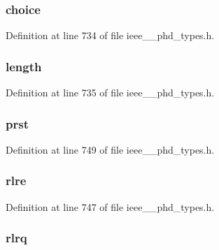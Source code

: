 \subsubsection[{choice}]{ choice}\label{struct___a_p_d_u_a034761fd73babd925f56cbb254ce4fb2}


Definition at line 734 of file ieee\+\_\+\_\+phd\+\_\+types.\+h.

\hypertarget{struct___a_p_d_u_a3743679e4ff85e3e1b3fc2e59973fbb3}{}
\subsubsection[{length}]{ length}\label{struct___a_p_d_u_a3743679e4ff85e3e1b3fc2e59973fbb3}


Definition at line 735 of file ieee\+\_\+\_\+phd\+\_\+types.\+h.

\hypertarget{struct___a_p_d_u_a9bdc7ac50342aab72d80c676a1bceec8}{}
\subsubsection[{prst}]{ prst}\label{struct___a_p_d_u_a9bdc7ac50342aab72d80c676a1bceec8}


Definition at line 749 of file ieee\+\_\+\_\+phd\+\_\+types.\+h.

\hypertarget{struct___a_p_d_u_a5e0affbdd4750dc05394cb9375b30910}{}
\subsubsection[{rlre}]{ rlre}\label{struct___a_p_d_u_a5e0affbdd4750dc05394cb9375b30910}


Definition at line 747 of file ieee\+\_\+\_\+phd\+\_\+types.\+h.

\hypertarget{struct___a_p_d_u_abcd59037cc4534745afa4bc8c8dfca8d}{}
\subsubsection[{rlrq}]{ rlrq}\label{struct___a_p_d_u_abcd59037cc4534745afa4bc8c8dfca8d}


